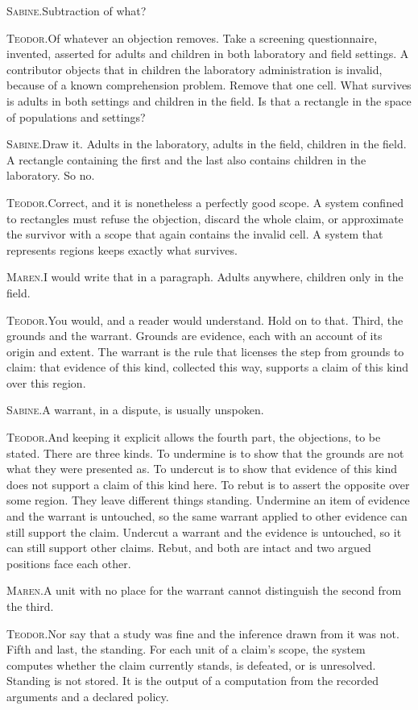 \documentclass[11pt]{article}
\newcommand{\say}[2]{\par\noindent\textsc{#1.}\enspace #2\par}
\newcommand{\MA}[1]{\say{Maren}{#1}}
\newcommand{\TE}[1]{\say{Teodor}{#1}}
\newcommand{\SA}[1]{\say{Sabine}{#1}}
\begin{document}
\SA{Subtraction of what?}

\TE{Of whatever an objection removes. Take a screening questionnaire, invented, asserted for adults and children in both laboratory and field settings. A contributor objects that in children the laboratory administration is invalid, because of a known comprehension problem. Remove that one cell. What survives is adults in both settings and children in the field. Is that a rectangle in the space of populations and settings?}

\SA{Draw it. Adults in the laboratory, adults in the field, children in the field. A rectangle containing the first and the last also contains children in the laboratory. So no.}

\TE{Correct, and it is nonetheless a perfectly good scope. A system confined to rectangles must refuse the objection, discard the whole claim, or approximate the survivor with a scope that again contains the invalid cell. A system that represents regions keeps exactly what survives.}

\MA{I would write that in a paragraph. Adults anywhere, children only in the field.}

\TE{You would, and a reader would understand. Hold on to that. Third, the grounds and the warrant. Grounds are evidence, each with an account of its origin and extent. The warrant is the rule that licenses the step from grounds to claim: that evidence of this kind, collected this way, supports a claim of this kind over this region.}

\SA{A warrant, in a dispute, is usually unspoken.}

\TE{And keeping it explicit allows the fourth part, the objections, to be stated. There are three kinds. To undermine is to show that the grounds are not what they were presented as. To undercut is to show that evidence of this kind does not support a claim of this kind here. To rebut is to assert the opposite over some region. They leave different things standing. Undermine an item of evidence and the warrant is untouched, so the same warrant applied to other evidence can still support the claim. Undercut a warrant and the evidence is untouched, so it can still support other claims. Rebut, and both are intact and two argued positions face each other.}

\MA{A unit with no place for the warrant cannot distinguish the second from the third.}

\TE{Nor say that a study was fine and the inference drawn from it was not. Fifth and last, the standing. For each unit of a claim's scope, the system computes whether the claim currently stands, is defeated, or is unresolved. Standing is not stored. It is the output of a computation from the recorded arguments and a declared policy.}
\end{document}
